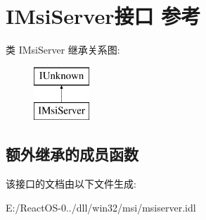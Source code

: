 \hypertarget{interface_i_msi_server}{}\section{I\+Msi\+Server接口 参考}
\label{interface_i_msi_server}
类 I\+Msi\+Server 继承关系图\+:\begin{figure}[H]
\begin{center}
\leavevmode
\includegraphics[height=2.000000cm]{interface_i_msi_server}
\end{center}
\end{figure}
\subsection*{额外继承的成员函数}


该接口的文档由以下文件生成\+:\begin{DoxyCompactItemize}
\item 
E\+:/\+React\+O\+S-\/0../dll/win32/msi/msiserver.\+idl\end{DoxyCompactItemize}
